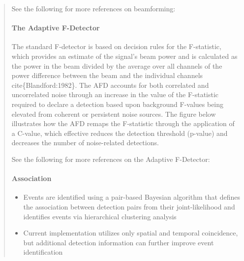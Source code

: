 \documentclass[letterpaper,10pt,english]{sphinxmanual}
\begin{document}
\begin{itemize}
\begin{quote}
See the following for more references on beamforming:


\paragraph{The Adaptive F-Detector}
\label{\detokenize{detection:the-adaptive-f-detector}}\label{\detokenize{detection:afd}}\label{\detokenize{detection::doc}}
The standard F-detector is based on decision rules for the F-statistic, which provides an estimate of the signal’s beam power and is calculated as the power in the beam divided by the average over all channels of the power difference between the beam and the individual channels cite\{Blandford:1982\}.  The AFD accounts for both correlated and uncorrelated noise through an increase in the value of the F-statistic required to declare a detection based upon background F-values being elevated from coherent or persistent noise sources. The figure below illustrates how the AFD remaps the F-statistic through the application of a C-value, which effective reduces the detection threshold (p-value) and decreases the number of noise-related detections.

\noindent{}

See the following for more references on the Adaptive F-Detector:



\paragraph{Association}
\label{\detokenize{association:association}}\label{\detokenize{association:id1}}\label{\detokenize{association::doc}}\begin{itemize}
\item {} 
Events are identified using a pair-based Bayesian algorithm that defines the association between detection pairs from their joint-likelihood and identifies events via hierarchical clustering analysis

\item {} 
Current implementation utilizes only spatial and temporal coincidence, but additional detection information can further improve event identification


\end{itemize}
\end{quote}
\end{itemize}
\end{document}
